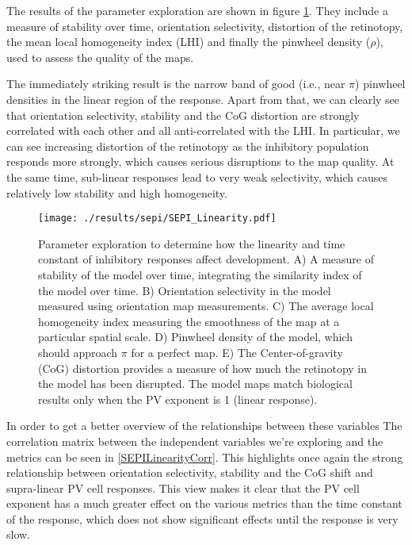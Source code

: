 The results of the parameter exploration are shown in figure
\ref{SEPILinearity}. They include a measure of stability over time,
orientation selectivity, distortion of the retinotopy, the mean local
homogeneity index (LHI) and finally the pinwheel density ($\rho$),
used to assess the quality of the maps.

The immediately striking result is the narrow band of good (i.e., near
$\pi$) pinwheel densities in the linear region of the response. Apart
from that, we can clearly see that orientation selectivity, stability
and the CoG distortion are strongly correlated with each other and all
anti-correlated with the LHI. In particular, we can see increasing
distortion of the retinotopy as the inhibitory population responds
more strongly, which causes serious disruptions to the map quality. At
the same time, sub-linear responses lead to very weak selectivity,
which causes relatively low stability and high homogeneity.

\begin{figure}
	\centering
        \texttt{[image: ./results/sepi/SEPI\_Linearity.pdf]}
	\caption{Parameter exploration to determine how the linearity and
      time constant of inhibitory responses affect development. A) A
      measure of stability of the model over time, integrating the
      similarity index of the model over time. B) Orientation
      selectivity in the model measured using orientation map
      measurements. C) The average local homogeneity index measuring
      the smoothness of the map at a particular spatial scale. D)
      Pinwheel density of the model, which should approach $\pi$ for a
      perfect map. E) The Center-of-gravity (CoG) distortion provides
      a measure of how much the retinotopy in the model has been
      disrupted.  The model maps match biological results only when
      the PV exponent is 1 (linear response).}
	\label{SEPILinearity}
\end{figure}

In order to get a better overview of the relationships between these
variables The correlation matrix between the independent variables
we're exploring and the metrics can be seen in
\ref{SEPILinearityCorr}. This highlights once again the strong
relationship between orientation selectivity, stability and the CoG
shift and supra-linear PV cell responses. This view makes it clear
that the PV cell exponent has a much greater effect on the various
metrics than the time constant of the response, which does not show
significant effects until the response is very slow.

